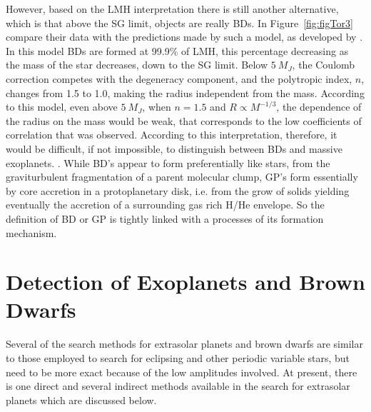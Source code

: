 However, based on the LMH interpretation there is still another alternative, which is that above the SG limit, objects are really BDs. In Figure~\ref{fig:figTor3} \citeauthor{Torres2016} compare their data with the predictions made by such a model, as developed by \citet{Burrows1993}. In this model BDs are formed at 99.9\% of 
LMH, this percentage decreasing as the mass of the star decreases, down to the SG limit. Below $5\ M_J$, the Coulomb correction competes 
with the degeneracy component, and the polytropic index, $n$, changes 
from 1.5 to 1.0, making the radius independent from the mass. 
According to this model, even above $5\ M_J$, 
when $n = 1.5$ and $R \propto M^{-1/3}$, the dependence of the radius on 
the mass would be weak, that corresponds to the low coefficients of correlation that was observed.  
According to this interpretation, therefore, it would be difficult, if not impossible, to distinguish between BDs and massive exoplanets. \citep{Torres2016}. 
While BD's appear to form preferentially like stars, from the graviturbulent fragmentation of a parent molecular clump, GP's form essentially by core accretion in a protoplanetary disk, i.e. from the grow of solids yielding eventually the accretion of a surrounding gas rich H/He envelope. So the definition of BD or GP is tightly linked with a processes of its formation mechanism.      

\section{Detection of Exoplanets and Brown Dwarfs}
Several of the search methods for extrasolar planets and brown dwarfs are similar to those employed to
search for eclipsing and other periodic variable stars, but need to be more exact
because of the low amplitudes involved. At present, there is one direct and several indirect
methods available in the search for extrasolar planets which are discussed below.

